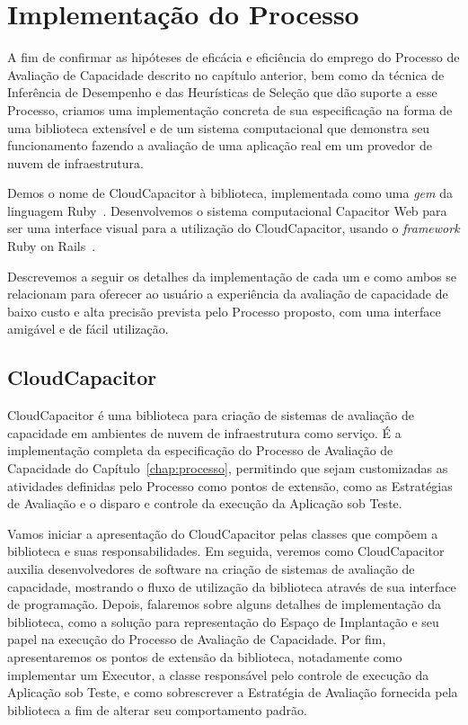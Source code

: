 \chapter{Implementação do Processo}
\label{chap:capacitor}
A fim de confirmar as hipóteses de eficácia e eficiência do emprego do Processo
de Avaliação de Capacidade descrito no capítulo anterior, bem como da técnica de
Inferência de Desempenho e das Heurísticas de Seleção que dão suporte a esse Processo, 
criamos uma implementação concreta de sua especificação na forma de uma biblioteca
extensível e de um sistema computacional que demonstra seu funcionamento fazendo
a avaliação de uma aplicação real em um provedor de nuvem de infraestrutura.

Demos o nome de CloudCapacitor à biblioteca, implementada como uma \emph{gem} da
linguagem Ruby~\cite{ruby}. Desenvolvemos o sistema computacional Capacitor Web 
para ser uma interface visual para a utilização do CloudCapacitor, usando 
o \emph{framework} Ruby on Rails~\cite{rails}.  

Descrevemos a seguir os detalhes da implementação de cada um e como ambos se
relacionam para oferecer ao usuário a experiência da avaliação de capacidade
de baixo custo e alta precisão prevista pelo Processo proposto, com uma interface
amigável e de fácil utilização.

\section{CloudCapacitor}
CloudCapacitor é uma biblioteca para criação de sistemas de avaliação de 
capacidade em ambientes de nuvem de infraestrutura como serviço. É a implementação
completa da especificação do Processo de Avaliação de Capacidade do 
Capítulo~\ref{chap:processo}, permitindo que sejam customizadas as atividades 
definidas pelo Processo como pontos de extensão, como as Estratégias de Avaliação
e o disparo e controle da execução da Aplicação sob Teste.

Vamos iniciar a apresentação do CloudCapacitor pelas classes que compõem a biblioteca
e suas responsabilidades. Em seguida, veremos como CloudCapacitor auxilia 
desenvolvedores de software na criação de sistemas de avaliação de capacidade,
mostrando o fluxo de utilização da biblioteca através de sua interface de programação.
Depois, falaremos sobre alguns detalhes de implementação da biblioteca, como 
a solução para representação do Espaço de Implantação e seu papel na execução do
Processo de Avaliação de Capacidade. Por fim, apresentaremos os pontos de extensão
da biblioteca, notadamente como implementar um Executor, a classe responsável pelo
controle de execução da Aplicação sob Teste, e como sobrescrever a Estratégia de
Avaliação fornecida pela biblioteca a fim de alterar seu comportamento padrão.

